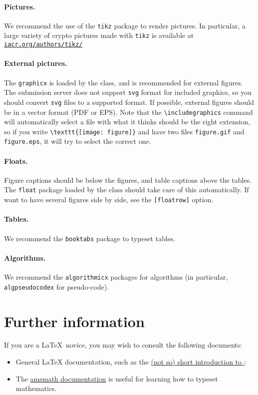 \documentclass{iacrcc}
\begin{document}
\paragraph{Pictures.}
We recommend the use of the \texttt{tikz} package to render pictures.
In particular, a large variety of crypto pictures made with
\texttt{tikz} is available at \href{http://iacr.org/authors/tikz/}{\texttt{iacr.org/authors/tikz/}}

\paragraph{External pictures.}  The \texttt{graphicx} is loaded by the
class, and is recommended for external figures. The submission server
does not support \texttt{svg} format for included graphics, so you
should convert \texttt{svg} files to a supported format.  If possible,
external figures should be in a vector format (PDF or EPS).  Note that
the \verb+\includegraphics+ command will automatically select a file
with what it thinks should be the right extension, so if you write
\verb+\texttt{[image: figure]}+ and have two files \texttt{figure.gif}
and \texttt{figure.eps}, it will try to select the correct one.

\paragraph{Floats.}
Figure captions should be below the figures, and table captions above
the tables.  The \texttt{float} package loaded by the class should
take care of this automatically.  If want to have several figures side
by side, see the \texttt{[floatrow]} option.

\paragraph{Tables.}
We recommend the \texttt{booktabs} package to typeset tables.

\paragraph{Algorithms.}
We recommend the \texttt{algorithmicx} packages for algorithms (in
particular, \texttt{algpseudocodex} for pseudo-code).

\section{Further information}
If you are a \LaTeX\ novice, you may wish to consult the following documents:
\begin{itemize}
\item General \LaTeX{} documentation, such as the
  \href{http://mirrors.ctan.org/info/lshort/english/lshort.pdf}{(not
    so) short introduction to \LaTeXe};
\item The
  \href{https://mirror.mwt.me/ctan/macros/latex/required/amsmath/amsldoc.pdf}{amsmath
    documentation} is useful for learning how to typeset mathematics.
\end{itemize}

\renewcommand{\refname}{Sample References}

\end{document}
